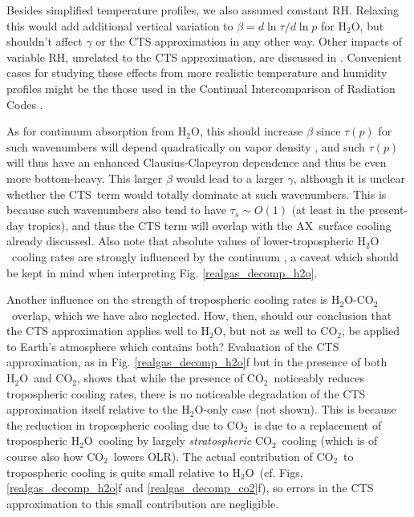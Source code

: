 \documentclass{ametsoc}
\newcommand{\cotwo}{\ensuremath{\mathrm{CO_2}}}
\newcommand{\htwo}{\ensuremath{\mathrm{H_2O}}}
\newcommand{\RH}{\ensuremath{\mathrm{RH}}}
\newcommand{\taus}{\ensuremath{\tau_s}}
\newcommand{\AX}{\ensuremath{\mathrm{AX}}}
\newcommand{\CTS}{\ensuremath{\mathrm{CTS}}}
\begin{document}
Besides simplified temperature profiles, we also assumed constant \RH.  Relaxing this would add additional vertical variation to  $\beta = d \ln \tau /d \ln p$ for \htwo, but shouldn't affect $\gamma$ or the CTS approximation in any other way. Other impacts of variable \RH, unrelated to the CTS approximation, are discussed in \cite{jeevanjee2019a}.   Convenient cases for studying these effects from more realistic temperature and humidity profiles might be the those used in the Continual Intercomparison of Radiation Codes \citep[CIRC;][]{oreopoulos2010}. 

As for continuum absorption from \htwo, this should increase $\beta$ since $\tau(p)$ for such wavenumbers will depend quadratically on vapor density \citep[because continuum pressure-broadening is largely self-broadening, e.g.][]{pierrehumbert2010}, and such $\tau(p)$  will thus have an enhanced Clausius-Clapeyron dependence and thus be even more bottom-heavy. This larger $\beta$ would lead to a larger $\gamma$, although it is unclear whether the \CTS\ term would totally dominate at such wavenumbers. This is because such wavenumbers also tend to have $\taus \sim O(1)$ (at least in the present-day tropics), and thus the CTS term will overlap with the \AX\ surface cooling already discussed. Also note that absolute values of lower-tropospheric \htwo\ cooling rates are strongly influenced by the continuum \citep{jeevanjee2019a}, a caveat which should be kept in mind when interpreting Fig. \ref{realgas_decomp_h2o}. 

Another influence on the strength of tropospheric cooling rates is \htwo-\cotwo\ overlap, which we have also neglected. How, then, should our conclusion that the CTS approximation applies well to \htwo, but not as well to \cotwo, be applied to Earth's atmosphere which contains both? Evaluation of the CTS approximation, as in Fig. \ref{realgas_decomp_h2o}f but in the presence of both \htwo\ and \cotwo, shows that while the presence of \cotwo\ noticeably reduces tropospheric cooling rates, there is no noticeable degradation of the CTS approximation itself relative to the \htwo-only case (not shown). This is because the reduction in tropospheric cooling due to \cotwo\ is due to a replacement of tropospheric \htwo\ cooling by largely \emph{stratospheric} \cotwo\ cooling (which is of course also how \cotwo\ lowers OLR). The actual contribution of \cotwo\ to tropospheric cooling is quite small relative to \htwo\ (cf. Figs. \ref{realgas_decomp_h2o}f and \ref{realgas_decomp_co2}f), so errors in the CTS approximation to this small contribution are negligible.
\end{document}
